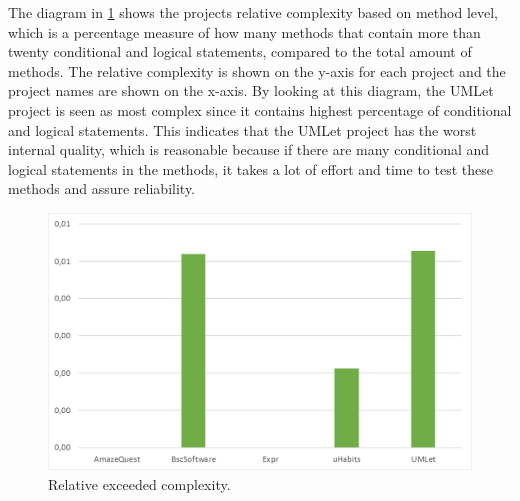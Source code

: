 \documentclass[conference]{IEEEtran}
\begin{document}
The diagram in \cref{fig:exceed_complexity} shows the projects relative complexity based on method level, which is a percentage measure of how many methods that contain more than twenty conditional and logical statements, compared to the total amount of methods. The relative complexity is shown on the y-axis for each project and the project names are shown on the x-axis. By looking at this diagram, the UMLet project is seen as most complex since it contains highest percentage of conditional and logical statements.  This indicates that the UMLet project has the worst internal quality, which is reasonable because if there are many conditional and logical statements in the methods, it takes a lot of effort and time to test these methods and assure reliability. 
\begin{figure}
	\includegraphics[width=\columnwidth]{img/rel_exceeded_complexity.png}
\caption{Relative exceeded complexity.}
\label{fig:exceed_complexity}
\end{figure}
\end{document}
